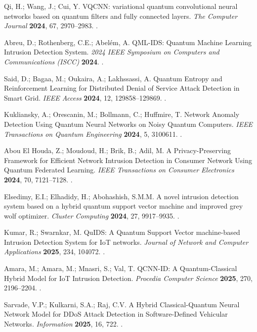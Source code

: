  Qi, H.; Wang, J.; Cui, Y. VQCNN: variational quantum convolutional neural networks based on quantum filters and fully connected layers. \emph{The Computer Journal} \textbf{2024}, 67, 2970--2983. .

 Abreu, D.; Rothenberg, C.E.; Abelém, A. QML-IDS: Quantum Machine Learning Intrusion Detection System. \emph{2024 IEEE Symposium on Computers and Communications (ISCC)} \textbf{2024}. .

 Said, D.; Bagaa, M.; Oukaira, A.; Lakhssassi, A. Quantum Entropy and Reinforcement Learning for Distributed Denial of Service Attack Detection in Smart Grid. \emph{IEEE Access} \textbf{2024}, 12, 129858--129869. .

 Kukliansky, A.; Orescanin, M.; Bollmann, C.; Huffmire, T. Network Anomaly Detection Using Quantum Neural Networks on Noisy Quantum Computers. \emph{IEEE Transactions on Quantum Engineering} \textbf{2024}, 5, 3100611. .

 Abou El Houda, Z.; Moudoud, H.; Brik, B.; Adil, M. A Privacy-Preserving Framework for Efficient Network Intrusion Detection in Consumer Network Using Quantum Federated Learning. \emph{IEEE Transactions on Consumer Electronics} \textbf{2024}, 70, 7121--7128. .

 Elsedimy, E.I.; Elhadidy, H.; Abohashish, S.M.M. A novel intrusion detection system based on a hybrid quantum support vector machine and improved grey wolf optimizer. \emph{Cluster Computing} \textbf{2024}, 27, 9917--9935. .

 Kumar, R.; Swarnkar, M. QuIDS: A Quantum Support Vector machine-based Intrusion Detection System for IoT networks. \emph{Journal of Network and Computer Applications} \textbf{2025}, 234, 104072. .

 Amara, M.; Amara, M.; Mnasri, S.; Val, T. QCNN-ID: A Quantum-Classical Hybrid Model for IoT Intrusion Detection. \emph{Procedia Computer Science} \textbf{2025}, 270, 2196--2204. .

 Sarvade, V.P.; Kulkarni, S.A.; Raj, C.V. A Hybrid Classical-Quantum Neural Network Model for DDoS Attack Detection in Software-Defined Vehicular Networks. \emph{Information} \textbf{2025}, 16, 722. .

